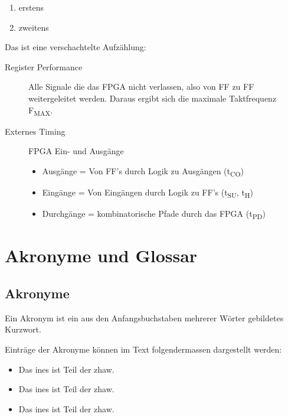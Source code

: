 \begin{enumerate}
\item erstens
\item zweitens
\end{enumerate}



Das ist eine verschachtelte Aufzählung:
\begin{description}
		\item [Register Performance] Alle Signale die das FPGA nicht verlassen, also von FF zu FF weitergeleitet werden. Daraus ergibt sich die maximale Taktfrequenz F\textsubscript{MAX}.

		\item [Externes Timing] FPGA Ein- und Ausgänge
		\begin{itemize}
			\item Ausgänge = Von FF's durch Logik zu Ausgängen (t\textsubscript{CO})
			\item Eingänge = Von Eingängen durch Logik zu FF's (t\textsubscript{SU}, t\textsubscript{H})
			\item Durchgänge = kombinatorische Pfade durch das FPGA (t\textsubscript{PD})
		\end{itemize}
\end{description}

\ifdefined\USEGLOSSARIES

	\section{Akronyme und Glossar}\label{acronymsandglossaries}
	
	\subsection{Akronyme}\label{acronymsandglossary.acronyms}
	Ein Akronym ist ein aus den Anfangsbuchstaben mehrerer Wörter gebildetes Kurzwort. 
	
	
	Einträge der Akronyme können im Text folgendermassen dargestellt werden:
	\begin{itemize}
		\item Das \acrshort{ines} ist Teil der \acrshort{zhaw}.
		\item Das \acrlong{ines} ist Teil der \acrlong{zhaw}.
		\item Das \acrfull{ines} ist Teil der \acrfull{zhaw}.
	\end{itemize}
	
